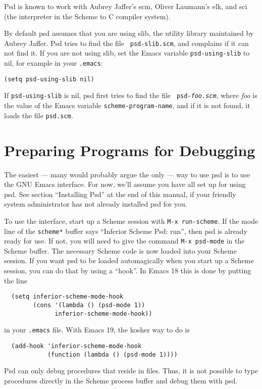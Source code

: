 Psd is known to work with Aubrey Jaffer's scm, Oliver Laumann's
elk, and sci (the interpreter in the
Scheme to C compiler system).

By default psd assumes that you are using slib, the utility library
maintained by Aubrey Jaffer. Psd tries to find the file {\tt
psd-slib.scm}, and complains if it can not find it. If you are not
using slib, set the Emacs variable {\tt psd-using-slib} to nil,
for example in your {\tt .emacs}:
\begin{verbatim}
(setq psd-using-slib nil)
\end{verbatim}

If {\tt psd-using-slib} is nil, psd first tries to find the file {\tt
psd-\it foo\tt.scm}, where {\it foo} is the value of the Emacs
variable {\tt scheme-program-name}, and if it is not found, it loads
the file {\tt psd.scm}.

\section{Preparing Programs for Debugging}

The easiest --- many would probably argue the only ---  way to use
psd is to use the GNU Emacs interface. For now, we'll assume you have
all set up for using psd. See section ``Installing Psd'' at the end of
this manual, if your friendly system administrator has not already
installed psd for you.

To use the interface, start up a Scheme session with {\tt M-x
run-scheme}. If the mode line of the {\tt *scheme*} buffer says
``Inferior Scheme Psd: run'', then psd is already ready for use. If not,
you will need to give the command {\tt M-x psd-mode} in the Scheme
buffer.  The necessary Scheme code is now loaded into your Scheme
session. If you want psd to be loaded automagically when you start up
a Scheme session, you can do that by using a ``hook''. In Emacs 18
this is done by putting the line
\begin{verbatim}
  (setq inferior-scheme-mode-hook 
        (cons '(lambda () (psd-mode 1))
              inferior-scheme-mode-hook))
\end{verbatim}
in your {\tt .emacs} file. With Emacs 19, the kosher way to do is
\begin{verbatim}
  (add-hook 'inferior-scheme-mode-hook 
            (function (lambda () (psd-mode 1)))) 
\end{verbatim}

Psd can only debug procedures that reside in files. Thus, it is not
possible to type procedures directly in the Scheme process buffer and
debug them with psd.

